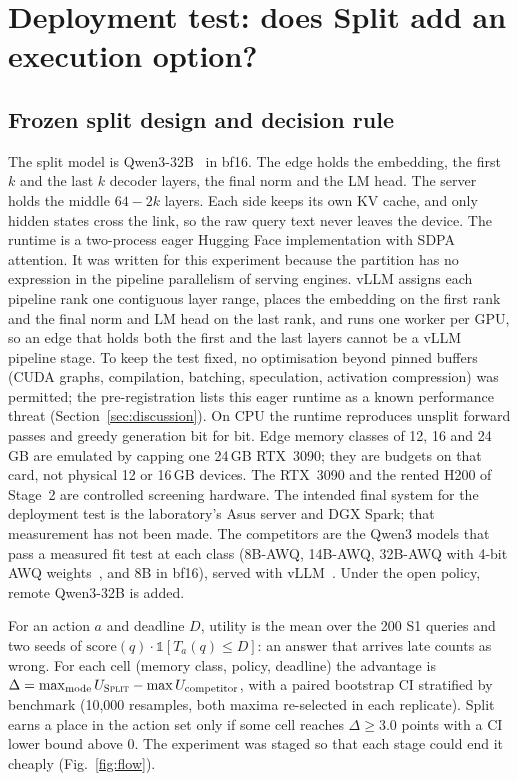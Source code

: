 \documentclass[lettersize,journal]{IEEEtran}
\begin{document}
\section{Deployment test: does Split add an execution option?}
\label{sec:b}

\subsection{Frozen split design and decision rule}
The split model is Qwen3-32B~\cite{qwen3} in bf16. The edge holds the embedding, the first $k$ and the last $k$ decoder layers, the final norm and the LM head. The server holds the middle $64-2k$ layers. Each side keeps its own KV cache, and only hidden states cross the link, so the raw query text never leaves the device. The runtime is a two-process eager Hugging Face implementation with SDPA attention. It was written for this experiment because the partition has no expression in the pipeline parallelism of serving engines. vLLM assigns each pipeline rank one contiguous layer range, places the embedding on the first rank and the final norm and LM head on the last rank, and runs one worker per GPU, so an edge that holds both the first and the last layers cannot be a vLLM pipeline stage. To keep the test fixed, no optimisation beyond pinned buffers (CUDA graphs, compilation, batching, speculation, activation compression) was permitted; the pre-registration lists this eager runtime as a known performance threat (Section~\ref{sec:discussion}). On CPU the runtime reproduces unsplit forward passes and greedy generation bit for bit. Edge memory classes of 12, 16 and 24\,GB are emulated by capping one 24\,GB RTX~3090; they are budgets on that card, not physical 12 or 16\,GB devices. The RTX~3090 and the rented H200 of Stage~2 are controlled screening hardware. The intended final system for the deployment test is the laboratory's Asus server and DGX Spark; that measurement has not been made. The competitors are the Qwen3 models that pass a measured fit test at each class (8B-AWQ, 14B-AWQ, 32B-AWQ with 4-bit AWQ weights~\cite{awq}, and 8B in bf16), served with vLLM~\cite{vllm}. Under the open policy, remote Qwen3-32B is added.

For an action $a$ and deadline $D$, utility is the mean over the 200 S1 queries and two seeds of $\text{score}(q)\cdot\mathbb{1}[T_a(q)\leq D]$: an answer that arrives late counts as wrong. For each cell (memory class, policy, deadline) the advantage is $\Delta=\max_{\text{mode}}U_{\textsc{Split}}-\max U_{\text{competitor}}$, with a paired bootstrap CI stratified by benchmark (10,000 resamples, both maxima re-selected in each replicate). Split earns a place in the action set only if some cell reaches $\Delta\geq3.0$ points with a CI lower bound above 0. The experiment was staged so that each stage could end it cheaply (Fig.~\ref{fig:flow}).
\end{document}
